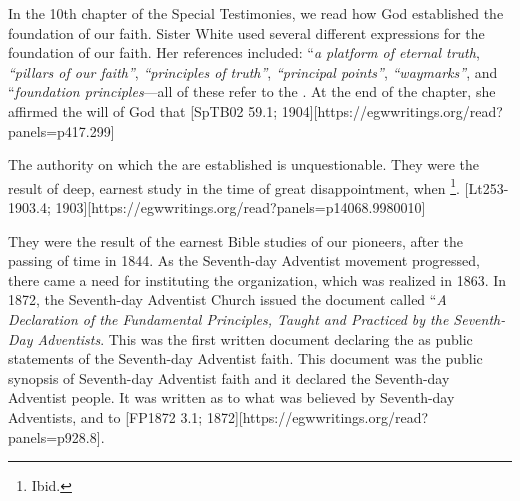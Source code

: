  \label{chap:authority}

In the 10th chapter of the Special Testimonies, we read how God established the foundation of our faith. Sister White used several different expressions for the foundation of our faith. Her references included: “\textit{a platform of eternal truth}, \textit{“pillars of our faith”}, \textit{“principles of truth”}, \textit{“principal points”}, \textit{“waymarks”}, and “\textit{foundation principles}—all of these refer to the . At the end of the chapter, she affirmed the will of God that [SpTB02 59.1; 1904][https://egwwritings.org/read?panels=p417.299]

The authority on which the  are established is unquestionable. They were the result of deep, earnest study in the time of great disappointment, when \footnote{Ibid.}. [Lt253-1903.4; 1903][https://egwwritings.org/read?panels=p14068.9980010]

They were the result of the earnest Bible studies of our pioneers, after the passing of time in 1844. As the Seventh-day Adventist movement progressed, there came a need for instituting the organization, which was realized in 1863. In 1872, the Seventh-day Adventist Church issued the document called “\textit{A Declaration of the Fundamental Principles, Taught and Practiced by the Seventh-Day Adventists}. This was the first written document declaring the  as public statements of the Seventh-day Adventist faith. This document was the public synopsis of Seventh-day Adventist faith and it declared  the Seventh-day Adventist people. It was written  as to what was believed by Seventh-day Adventists,  and to [FP1872 3.1; 1872][https://egwwritings.org/read?panels=p928.8].

